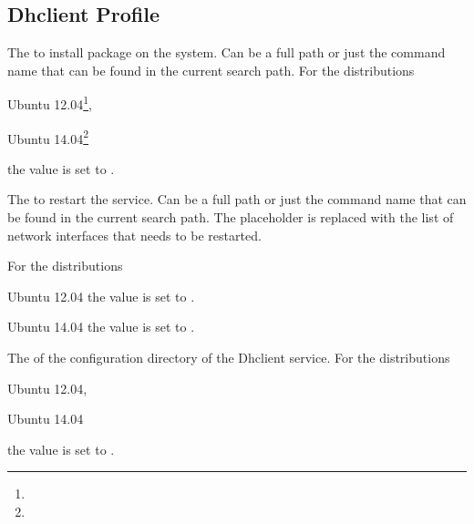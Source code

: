 \label{sec:dhclient_profile}
\subsection{Dhclient Profile}


The  to install package on the system. Can be a full path or
just the command name that can be found in the current search path. 
For the distributions
\begin{inparaitem}
\item[\TheDistribution{ubuntu}] Ubuntu 12.04\footnote{\TheUbuntuPreciseLTSDate},
\item[\TheDistribution{ubuntu}] Ubuntu 14.04\footnote{\TheUbuntuTrustyLTSDate}
\end{inparaitem}
the value is set to .


The  to restart the service. Can be a full path or
just the command name that can be found in the current search path. 
The placeholder  is replaced with the list of network
interfaces that needs to be restarted.

For the distributions
\begin{inparaitem}
\item[\TheDistribution{ubuntu}] Ubuntu 12.04
the value is set to .
\end{inparaitem}
\begin{inparaitem}
\item[\TheDistribution{ubuntu}] Ubuntu 14.04
the value is set to .
\end{inparaitem}


The  of the configuration directory of the Dhclient service. 
For the distributions
\begin{inparaitem}
\item[\TheDistribution{ubuntu}] Ubuntu 12.04,
\item[\TheDistribution{ubuntu}] Ubuntu 14.04
\end{inparaitem}
the value is set to .

